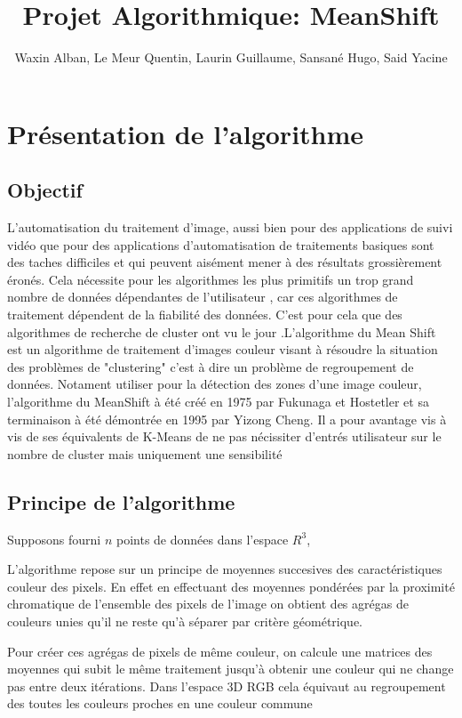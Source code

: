 \documentclass[12pt,a4paper]{article}
\title{Projet Algorithmique: MeanShift}
\author{Waxin Alban, Le Meur Quentin, Laurin Guillaume, Sansané Hugo, Said Yacine}
\begin{document}
\maketitle\newpage
\raggedright
\section*{Présentation de l'algorithme}

\subsection*{Objectif}
L'automatisation du traitement d'image, aussi bien pour des applications de suivi vidéo que pour
des applications d'automatisation de traitements basiques sont des taches difficiles et qui peuvent
aisément mener à des résultats grossièrement éronés. Cela nécessite pour les algorithmes les plus 
primitifs un trop grand nombre de données dépendantes de l'utilisateur , car ces algorithmes de traitement 
dépendent de la fiabilité des données. C'est pour cela que des algorithmes de recherche de cluster ont vu le jour
.L'algorithme du Mean Shift est un algorithme de traitement d'images couleur
visant à résoudre la situation des problèmes de "clustering" c'est à dire un problème de regroupement de données.
Notament utiliser pour la détection des zones d'une image couleur, l'algorithme du MeanShift à été créé en 1975 par Fukunaga et Hostetler
et sa terminaison à été démontrée en 1995 par Yizong Cheng. Il a pour avantage vis à vis de ses équivalents de K-Means
de ne pas nécissiter d'entrés utilisateur sur le nombre de cluster mais uniquement une sensibilité

\subsection*{Principe de l'algorithme}

Supposons fourni $n$ points de données dans l'espace $R^3$,

L'algorithme repose sur un principe de moyennes succesives des caractéristiques couleur des pixels. En effet 
en effectuant des moyennes pondérées par la proximité chromatique de l'ensemble des pixels de l'image on 
obtient des agrégas de couleurs unies qu'il ne reste qu'à séparer par critère géométrique.

Pour créer ces agrégas de pixels de même couleur, on calcule une matrices des moyennes qui subit 
le même traitement jusqu'à obtenir une couleur qui ne change pas entre deux itérations. Dans l'espace 3D RGB 
cela équivaut au regroupement des toutes les couleurs proches en une couleur commune 
\end{document}
